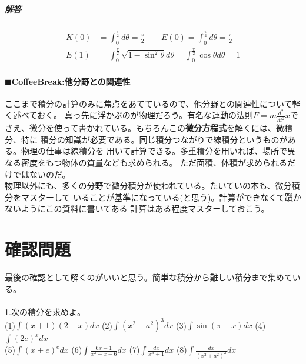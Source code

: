 \documentclass[a4j,dvipdfmx]{jsarticle}
\begin{document}
\subsubsection*{解答}
\begin{align*}
    K(0)&=\int_0^\frac{\pi}{2}d\theta=\frac{\pi}{2}\qquad E(0)=\int_0^\frac{\pi}{2}d\theta=\frac{\pi}{2}\\
    E(1)&=\int_0^\frac{\pi}{2}\sqrt{1-\sin^2\theta}d\theta=\int_0^\frac{\pi}{2}\cos\theta d\theta=1
\end{align*}
\hrulefill
\subsection*{$\blacksquare$CoffeeBreak:他分野との関連性}
\begin{screen}
    ここまで積分の計算のみに焦点をあてているので、他分野との関連性について軽く述べておく。
    真っ先に浮かぶのが物理だろう。有名な運動の法則$\displaystyle F=m\frac{d^2}{dt^2}x$で
    さえ、微分を使って書かれている。もちろんこの\textbf{微分方程式}を解くには、微積分、特に
    積分の知識が必要である。同じ積分つながりで線積分というものがある。物理の仕事は線積分を
    用いて計算できる。多重積分を用いれば、場所で異なる密度をもつ物体の質量なども求められる。
    ただ面積、体積が求められるだけではないのだ。\\
    物理以外にも、多くの分野で微分積分が使われている。たいていの本も、微分積分をマスターして
    いることが基準になっている(と思う)。計算ができなくて躓かないようにこの資料に書いてある
    計算はある程度マスターしておこう。
\end{screen}
\newpage
\part{確認問題}
最後の確認として解くのがいいと思う。簡単な積分から難しい積分まで集めている。\\
\hrulefill\\
1.次の積分を求めよ。\\

(1)$\displaystyle \int(x+1)(2-x)dx$
\hspace{10mm}
(2)$\displaystyle \int(x^2+a^2)^3dx$
\hspace{10mm}
(3)$\displaystyle \int\sin(\pi-x)dx$
\hspace{10mm}
(4)$\displaystyle \int (2e)^{x}dx$\\

(5)$\displaystyle \int(x+e)^e dx$
\hspace{19mm}
(6)$\displaystyle \int\frac{6x-1}{x^2-x-6}dx$
\hspace{9mm}
(7)$\displaystyle \int \frac{dx}{x^3+1}dx$
\hspace{15mm}
(8)$\displaystyle \int\frac{dx}{(x^2+a^2)^2}dx$\\
\end{document}
